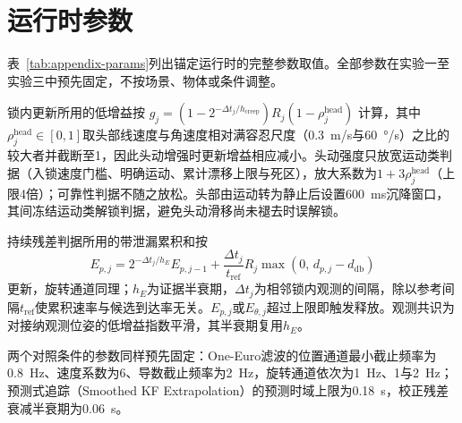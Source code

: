 
\section{运行时参数}\label{sec:appendix}

表~\ref{tab:appendix-params}列出锚定运行时的完整参数取值。全部参数在实验一至实验三中预先固定，不按场景、物体或条件调整。

锁内更新所用的低增益按
$g_j = (1 - 2^{-\Delta t_j / h_{\mathrm{creep}}}) R_j
(1 - \rho_j^{\mathrm{head}})$
计算，其中$\rho_j^{\mathrm{head}} \in [0,1]$取头部线速度与角速度相对满容忍尺度（0.3~m/s与60~°/s）之比的较大者并截断至1，因此头动增强时更新增益相应减小。头动强度只放宽运动类判据（入锁速度门槛、明确运动、累计漂移上限与死区），放大系数为$1+3\rho_j^{\mathrm{head}}$（上限4倍）；可靠性判据不随之放松。头部由运动转为静止后设置600~ms沉降窗口，其间冻结运动类解锁判据，避免头动滑移尚未褪去时误解锁。

持续残差判据所用的带泄漏累积和按
\begin{equation}
E_{p,j} = 2^{-\Delta t_j / h_E} E_{p,j-1} + \frac{\Delta t_j}{t_{\mathrm{ref}}} R_j \max\!\left(0,\, d_{p,j} - d_{\mathrm{db}}\right)
\label{eq:cusum}
\end{equation}
更新，旋转通道同理；$h_E$为证据半衰期，$\Delta t_j$为相邻锁内观测的间隔，除以参考间隔$t_{\mathrm{ref}}$使累积速率与候选到达率无关。$E_{p,j}$或$E_{\theta,j}$超过上限即触发释放。观测共识为对接纳观测位姿的低增益指数平滑，其半衰期复用$h_E$。

两个对照条件的参数同样预先固定：One-Euro滤波的位置通道最小截止频率为0.8~Hz、速度系数为6、导数截止频率为2~Hz，旋转通道依次为1~Hz、1与2~Hz；预测式追踪（Smoothed KF Extrapolation）的预测时域上限为0.18~s，校正残差衰减半衰期为0.06~s。

